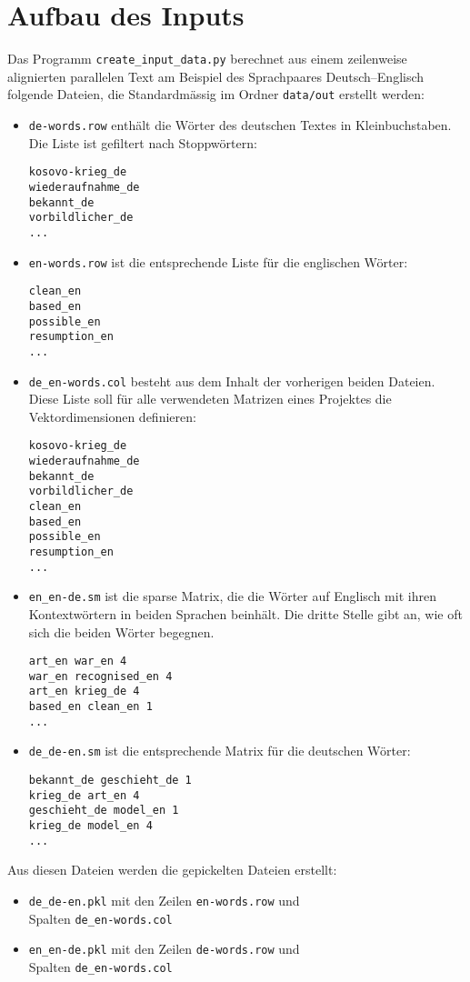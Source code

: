 \documentclass[11pt,twoside,openright]{mpreport}
\begin{document}
\chapter{Aufbau des Inputs}
\label{cha:input}
Das Programm \verb+create_input_data.py+ berechnet aus einem zeilenweise alignierten parallelen Text am Beispiel des Sprachpaares Deutsch--Englisch folgende Dateien, die Standardmässig im Ordner \verb+data/out+ erstellt werden:
\begin{itemize}
\item \verb+de-words.row+ enthält die Wörter des deutschen Textes in Kleinbuchstaben. Die Liste ist gefiltert nach Stoppwörtern:
\begin{verbatim}
kosovo-krieg_de
wiederaufnahme_de
bekannt_de
vorbildlicher_de
...
\end{verbatim}
\item \verb+en-words.row+ ist die entsprechende Liste für die englischen Wörter:
\begin{verbatim}
clean_en
based_en
possible_en
resumption_en
...
\end{verbatim}
\item \verb+de_en-words.col+ besteht aus dem Inhalt der vorherigen beiden Dateien. Diese Liste soll für alle verwendeten Matrizen eines Projektes die Vektordimensionen definieren:
\begin{verbatim}
kosovo-krieg_de
wiederaufnahme_de
bekannt_de
vorbildlicher_de
clean_en
based_en
possible_en
resumption_en
...
\end{verbatim}
\item \verb+en_en-de.sm+ ist die sparse Matrix, die die Wörter auf Englisch mit ihren Kontextwörtern in beiden Sprachen beinhält. Die dritte Stelle gibt an, wie oft sich die beiden Wörter begegnen. 
\begin{verbatim}
art_en war_en 4
war_en recognised_en 4
art_en krieg_de 4
based_en clean_en 1
...
\end{verbatim}
\item \verb+de_de-en.sm+ ist die entsprechende Matrix für die deutschen Wörter:
\begin{verbatim}
bekannt_de geschieht_de 1
krieg_de art_en 4
geschieht_de model_en 1
krieg_de model_en 4
...
\end{verbatim}
\end{itemize}

Aus diesen Dateien werden die gepickelten Dateien erstellt:
\begin{itemize}
\item \verb+de_de-en.pkl+ mit den Zeilen \verb+en-words.row+ und \\Spalten \verb+de_en-words.col+
\item \verb+en_en-de.pkl+ mit den Zeilen \verb+de-words.row+ und \\Spalten \verb+de_en-words.col+
\end{itemize}
\end{document}
